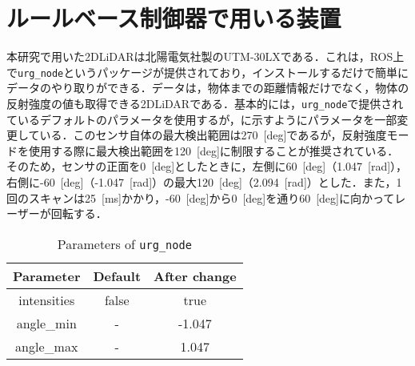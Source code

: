 
\section{ルールベース制御器で用いる装置}

  本研究で用いた2DLiDARは北陽電気社製のUTM-30LX\cite{hokuyo}である．これは，ROS上で\texttt{urg\_node}\cite{urg_node}というパッケージが提供されており，インストールするだけで簡単にデータのやり取りができる．データは，物体までの距離情報だけでなく，物体の反射強度の値も取得できる2DLiDARである．基本的には，\texttt{urg\_node}で提供されているデフォルトのパラメータを使用するが，に示すようにパラメータを一部変更している．このセンサ自体の最大検出範囲は270 \,[deg]であるが，反射強度モードを使用する際に最大検出範囲を120 \,[deg]に制限することが推奨されている\cite{urg_node}．そのため，センサの正面を0 \,[deg]としたときに，左側に60 \,[deg]（1.047 \,[rad]），右側に-60 \,[deg]（-1.047 \,[rad]）の最大120 \,[deg]（2.094 \,[rad]）とした．また，1回のスキャンは25 \,[ms]かかり，-60 \,[deg]から0 \,[deg]を通り60 \,[deg]に向かってレーザーが回転する．

  \begin{table}[hbtp]
    \caption{Parameters of \texttt{urg\_node}}
    \label{tab:parameters_of_urg_node}
    \centering
    \begin{tabular}{|c|c|c|}
    \hline
    Parameter   & Default & After change \\ \hline
    intensities & false   & true         \\ \hline
    angle\_min  & -       & -1.047       \\ \hline
    angle\_max  & -       & 1.047        \\ \hline
    \end{tabular}
    \end{table}

\newpage